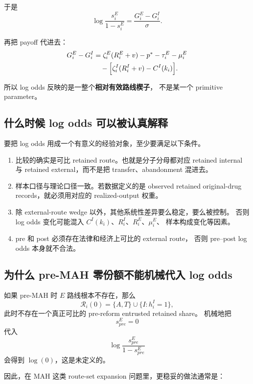 \documentclass[12pt,UTF8]{ctexart}
\newcommand{\Rset}{\mathcal{R}}
\theoremstyle{plain}
\theoremstyle{remark}
\begin{document}
于是
\begin{equation}
\log\frac{s_i^E}{1-s_i^E}
=
\frac{G_i^E-G_i^I}{\sigma}.
\label{eq:logodds_basic}
\end{equation}

再把 payoff 代进去：
\begin{align}
G_i^E-G_i^I
&=
\zeta_i^E(R_i^E+v)-p^*-\tau_i^E-\mu_i^E
\notag\\
&\quad
-\Bigl[\zeta_i^I(R_i^I+v)-C^I(k_i)\Bigr].
\label{eq:payoff_gap}
\end{align}

所以 log odds 反映的是一整个\textbf{相对有效路线楔子}，
不是某一个 primitive parameter。

\subsection{什么时候 log odds 可以被认真解释}

要把 log odds 用成一个有意义的经验对象，至少要满足以下条件。

\begin{enumerate}[leftmargin=2em]
    \item 比较的确实是可比 retained route。也就是分子分母都对应
    retained internal 与 retained external，而不是把 transfer、abandonment
    混进去。
    \item 样本口径与理论口径一致。若数据定义的是 observed retained
    original-drug records，就必须用对应的 realized-output 权重。
    \item 除 external-route wedge 以外，其他系统性差异要么稳定，要么被控制。
    否则 log odds 变化可能混入 $C^I(k_i)$、$R_i^I$、$R_i^E$、$\mu_i^E$、
    样本构成变化等因素。
    \item pre 和 post 必须存在法律和经济上可比的 external route，
    否则 pre--post log odds 本身就不合法。
\end{enumerate}

\subsection{为什么 pre-MAH 零份额不能机械代入 log odds}

如果 pre-MAH 时 $E$ 路线根本不存在，那么
\[
\Rset_i(0)=\{A,T\}\cup\{I:h_i^I=1\},
\]
此时不存在一个真正可比的 pre-reform entrusted retained share。
机械地把
\[
s_{pre}^E=0
\]
代入
\[
\log\frac{s_{pre}^E}{1-s_{pre}^E}
\]
会得到 $\log(0)$，这是未定义的。

因此，在 MAH 这类 route-set expansion 问题里，更稳妥的做法通常是：
\end{document}
